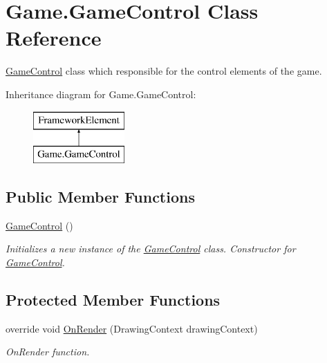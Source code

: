 \hypertarget{class_game_1_1_game_control}{}\section{Game.\+Game\+Control Class Reference}
\label{class_game_1_1_game_control}


\mbox{\hyperlink{class_game_1_1_game_control}{Game\+Control}} class which responsible for the control elements of the game.  


Inheritance diagram for Game.\+Game\+Control\+:\begin{figure}[H]
\begin{center}
\leavevmode
\includegraphics[height=2.000000cm]{class_game_1_1_game_control}
\end{center}
\end{figure}
\subsection*{Public Member Functions}
\begin{DoxyCompactItemize}
\item 
\mbox{\hyperlink{class_game_1_1_game_control_a61be983ae9907130c5b76ef9a7cc95f7}{Game\+Control}} ()
\begin{DoxyCompactList}\small\item\em Initializes a new instance of the \mbox{\hyperlink{class_game_1_1_game_control}{Game\+Control}} class. Constructor for \mbox{\hyperlink{class_game_1_1_game_control}{Game\+Control}}. \end{DoxyCompactList}\end{DoxyCompactItemize}
\subsection*{Protected Member Functions}
\begin{DoxyCompactItemize}
\item 
override void \mbox{\hyperlink{class_game_1_1_game_control_a16e0be24a3d4e6e8ce15950e66f51309}{On\+Render}} (Drawing\+Context drawing\+Context)
\begin{DoxyCompactList}\small\item\em On\+Render function. \end{DoxyCompactList}\end{DoxyCompactItemize}
